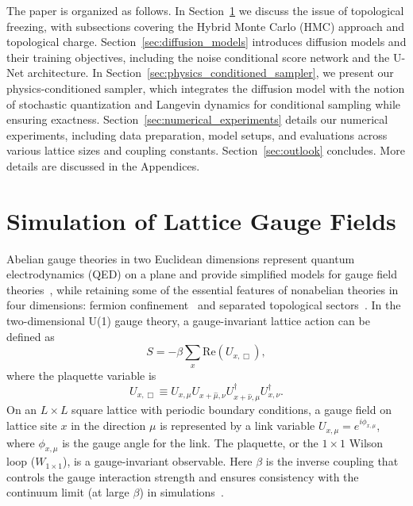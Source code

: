 \documentclass[a4paper,11pt]{article}
\begin{document}
The paper is organized as follows. In 
Section~\ref{sec:lattice_gauge_fields} we discuss the issue of topological freezing, with subsections covering the Hybrid Monte Carlo (HMC) approach and topological charge. Section~\ref{sec:diffusion_models} introduces diffusion models and their training objectives, including the noise conditional score network and the U-Net architecture. In Section~\ref{sec:physics_conditioned_sampler}, we present our physics-conditioned sampler, which integrates the diffusion model with the notion of stochastic quantization and Langevin dynamics for conditional sampling while ensuring exactness. Section~\ref{sec:numerical_experiments} details our numerical experiments, including data preparation, model setups, and evaluations across various lattice sizes and coupling constants.  Section~\ref{sec:outlook} concludes. More details are discussed in the Appendices. 


\section{Simulation of Lattice Gauge Fields}
\label{sec:lattice_gauge_fields}

Abelian gauge theories in two Euclidean dimensions represent quantum electrodynamics (QED) on a plane and provide simplified models for gauge field theories~\cite{Gattringer:2010zz,Greensite:2011zz,Kanwar:2020xzo,Crean:2024nro}, while retaining some of the essential features of nonabelian theories in four dimensions: fermion confinement~\cite{Coleman:1975pw} and separated topological sectors~\cite{Greensite:2011zz}. In the two-dimensional U(1) gauge theory, a gauge-invariant lattice action can be defined as
\begin{equation}
    S = -\beta \sum_{x} \text{Re}(U_{x,\Box}),\label{eq:action}
\end{equation}
where the plaquette variable is
\begin{equation}
    U_{x,\Box} \equiv U_{x,\mu} U_{x+\hat{\mu},\nu} U_{x+\hat{\nu},\mu}^\dagger U_{x,\nu}^\dagger.
\end{equation}
On an $L \times L$ square lattice with periodic boundary conditions, a gauge field on lattice site $x$ in the direction $\mu$ is represented by a link variable $U_{x,\mu} = e^{i \phi_{x,\mu}}$, where $\phi_{x,\mu}$ is the gauge angle for the link. The plaquette, or the $1\times1$ Wilson loop ($W_{1\times1}$), is a gauge-invariant observable.
Here $\beta$ is the inverse coupling that controls the gauge interaction strength and ensures consistency with the continuum limit (at large $\beta$) in simulations~\cite{Gattringer:2010zz}. 
\end{document}
